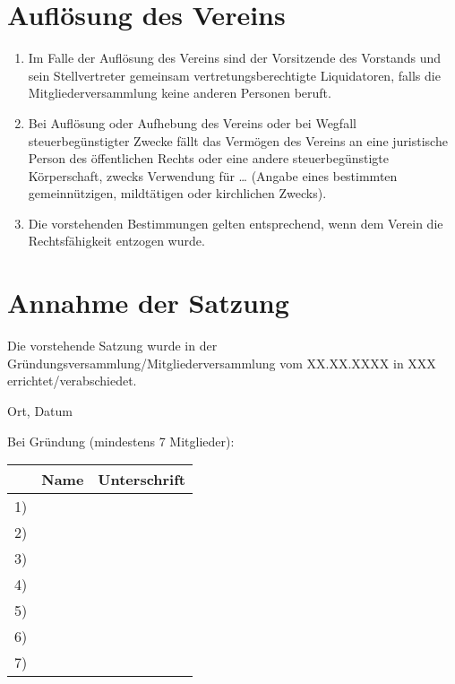 \documentclass{scrartcl}
\begin{document}
\section{Auflösung des Vereins}

\begin{contract}
\Clause[title={Auflösung des Vereins, Beendigung aus anderen Gründen, Wegfall steuerbegünstigter Zwecke}]  
\begin{enumerate}
    \item  Im Falle der Auflösung des Vereins sind der Vorsitzende des Vorstands und sein Stellvertreter gemeinsam vertretungsberechtigte Liquidatoren, falls die Mitgliederversammlung keine anderen Personen beruft.
    \item Bei Auflösung oder Aufhebung des Vereins oder bei Wegfall steuerbegünstigter Zwecke fällt das Vermögen des Vereins an eine juristische Person des öffentlichen Rechts oder eine  andere steuerbegünstigte Körperschaft, zwecks Verwendung für … (Angabe eines bestimmten gemeinnützigen, mildtätigen oder kirchlichen Zwecks).
    \item Die vorstehenden Bestimmungen gelten entsprechend, wenn dem Verein die Rechtsfähigkeit entzogen wurde.
\end{enumerate}
\end{contract}

\pagebreak
\section{Annahme der Satzung}
Die vorstehende Satzung wurde in der Gründungsversammlung/Mitgliederversammlung vom XX.XX.XXXX in XXX errichtet/verabschiedet. 

\vspace{2cm}
Ort, Datum

Bei Gründung (mindestens 7 Mitglieder):

\begin{tabular}{r p{} p{}}
    & Name & Unterschrift \\ \midrule
    1) \vspace{1.5cm}    & & \\ \midrule
    2) \vspace{1.5cm}    & & \\ \midrule
    3) \vspace{1.5cm}    & & \\ \midrule
    4) \vspace{1.5cm}    & & \\ \midrule
    5) \vspace{1.5cm}    & & \\ \midrule
    6) \vspace{1.5cm}    & & \\ \midrule
    7) \vspace{1.5cm}    & & \\ \midrule
\end{tabular}
\end{document}
